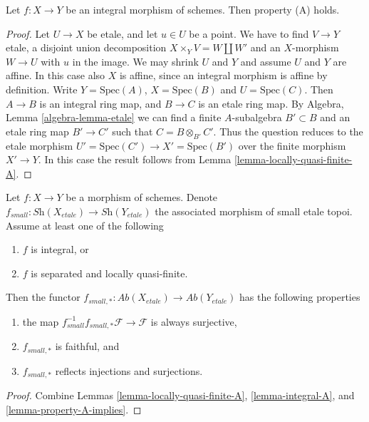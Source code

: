 \begin{lemma}
\label{lemma-integral-A}
Let $f : X \to Y$ be an integral morphism of schemes.
Then property (A) holds.
\end{lemma}

\begin{proof}
Let $U \to X$ be etale, and let $u \in U$ be a point.
We have to find $V \to Y$ etale, a disjoint union decomposition
$X \times_Y V = W \amalg W'$ and an $X$-morphism $W \to U$
with $u$ in the image. We may shrink $U$ and $Y$ and assume
$U$ and $Y$ are affine. In this case also $X$ is affine, since
an integral morphism is affine by definition. Write $Y = \text{Spec}(A)$,
$X = \text{Spec}(B)$ and $U = \text{Spec}(C)$. Then $A \to B$ is an
integral ring map, and $B \to C$ is an etale ring map. By
Algebra, Lemma \ref{algebra-lemma-etale}
we can find a finite $A$-subalgebra $B' \subset B$ and an etale ring
map $B' \to C'$ such that $C = B \otimes_{B'} C'$. Thus the question
reduces to the etale morphism
$U' = \text{Spec}(C') \to X' = \text{Spec}(B')$
over the finite morphism $X' \to Y$. In this case the result follows from
Lemma \ref{lemma-locally-quasi-finite-A}.
\end{proof}

\begin{lemma}
\label{lemma-when-push-pull-surjective}
Let $f : X \to Y$ be a morphism of schemes.
Denote $f_{small} : \textit{Sh}(X_{etale}) \to \textit{Sh}(Y_{etale})$
the associated morphism of small etale topoi. Assume at least one
of the following
\begin{enumerate}
\item $f$ is integral, or
\item $f$ is separated and locally quasi-finite.
\end{enumerate}
Then the functor
$f_{small, *} : \textit{Ab}(X_{etale}) \to \textit{Ab}(Y_{etale})$
has the following properties
\begin{enumerate}
\item the map
$f_{small}^{-1}f_{small, *}\mathcal{F} \to \mathcal{F}$
is always surjective,
\item $f_{small, *}$ is faithful, and
\item $f_{small, *}$ reflects injections and surjections.
\end{enumerate}
\end{lemma}

\begin{proof}
Combine
Lemmas \ref{lemma-locally-quasi-finite-A},
\ref{lemma-integral-A}, and
\ref{lemma-property-A-implies}.
\end{proof}



